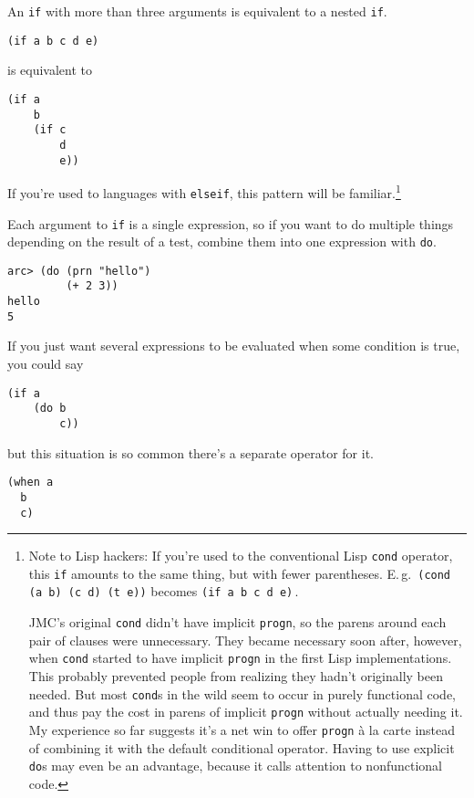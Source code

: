 \documentclass[a4paper,12pt]{book}
\begin{document}
An \verb|if| with more than three arguments is equivalent to a nested \verb|if|.

\begin{verbatim}
(if a b c d e)
\end{verbatim}

is equivalent to

\begin{verbatim}
(if a
    b
    (if c
        d
        e))
\end{verbatim}

If you're used to languages with \verb|elseif|, this pattern will be
familiar.\footnote{%
Note to {\sc{}Lisp} hackers: If you're used to the conventional {\sc{}Lisp}
{\tt{}cond} operator, this {\tt{}if} amounts to the same thing, but with fewer
parentheses.  E.\,g.\ {\tt (cond (a b) (c d) (t e))} becomes {\tt (if a b c d e)}\,.

JMC's original {\tt{}cond} didn't have implicit {\tt{}progn}, so the parens around
each pair of clauses were unnecessary.  They became necessary soon
after, however, when {\tt{}cond} started to have implicit {\tt{}progn} in the
first {\sc{}Lisp} implementations.  This probably prevented people from
realizing they hadn't originally been needed.  But most {\tt{}cond}s in
the wild seem to occur in purely functional code, and thus pay the
cost in parens of implicit {\tt{}progn} without actually needing it.  My
experience so far suggests it's a net win to offer {\tt{}progn} \`a la carte
instead of combining it with the default conditional operator.
Having to use explicit {\tt{}do}s may even be an advantage, because it
calls attention to nonfunctional code.
}

Each argument to \verb|if| is a single expression, so if you want to do
multiple things depending on the result of a test, combine them
into one expression with \verb|do|.

\begin{verbatim}
arc> (do (prn "hello") 
         (+ 2 3))                             
hello
5
\end{verbatim}

If you just want several expressions to be evaluated when some
condition is true, you could say

\begin{verbatim}
(if a
    (do b
        c))
\end{verbatim}

but this situation is so common there's a separate operator for it.

\begin{verbatim}
(when a
  b
  c)
\end{verbatim}
\end{document}
